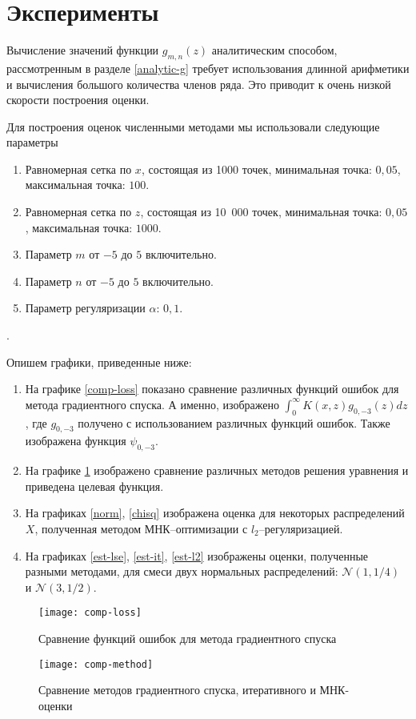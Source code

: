 \documentclass[../paper.tex]{subfiles}
\begin{document}
\section{Эксперименты}
%
Вычисление значений функции $g_{m,n}(z)$ аналитическим способом, рассмотренным в разделе \ref{analytic-g} требует использования длинной арифметики
и вычисления большого количества членов ряда. Это приводит к очень низкой скорости построения оценки. 

Для построения оценок численными методами мы использовали следующие параметры
\begin{enumerate}
	\item Равномерная сетка по $x$, состоящая из 1000 точек, минимальная точка: $0{,}05$, максимальная точка: $100$.
	\item Равномерная сетка по $z$, состоящая из 10~000 точек, минимальная точка: $0{,}05$, максимальная точка: $1000$.
	\item Параметр $m$ от $-5$ до $5$ включительно.
	\item Параметр $n$ от $-5$ до $5$ включительно.
	\item Параметр регуляризации $\alpha$: $0{,}1$.
\end{enumerate}.

Опишем графики, приведенные ниже:
\begin{enumerate}
	\item На графике \ref{comp-loss} показано сравнение различных функций ошибок для метода градиентного спуска.
		А именно, изображено $\int_0^\infty K(x,z)g_{0,-3}(z)dz$, где $g_{0,-3}$ получено с использованием различных функций ошибок.
		Также изображена функция $\psi_{0,-3}$.
	\item На графике \ref{comp-method} изображено сравнение различных методов решения уравнения и приведена целевая функция.
	\item На графиках \ref{norm}, \ref{chisq} изображена оценка для некоторых распределений $X$, полученная методом МНК--оптимизации с $l_2$--регуляризацией.
	\item На графиках \ref{est-lse}, \ref{est-it}, \ref{est-l2} изображены оценки, полученные разными методами, для смеси двух нормальных распределений: $\mathcal{N}(1, 1/4)$ и $\mathcal{N}(3, 1/2)$. 
\end{enumerate}

\begin{figure}[h]
	\begin{minipage}{0.48\textwidth}
		\centering
		\texttt{[image: comp-loss]}
		\caption{Сравнение функций ошибок для метода градиентного спуска}
		\label{comp-loss}
	\end{minipage}\hfill
	\begin{minipage}{0.48\textwidth}
		\centering
		\texttt{[image: comp-method]}
		\caption{Сравнение методов градиентного спуска, итеративного и МНК-оценки}
		\label{comp-method}
	\end{minipage}\hfill
\end{figure}
\end{document}
